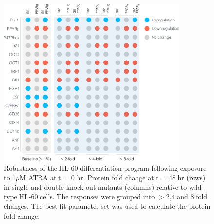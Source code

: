 \documentclass[12pt]{article}
\begin{document}
\begin{figure}[!t]\centering
\includegraphics[width=0.85\textwidth]{./figs/Fig-7-GeneKO-Simulations.pdf}
\caption{Robustness of the HL-60 differentiation program following exposure to 1$\mu$M ATRA at t = 0 hr.
Protein fold change at t = 48 hr (rows) in single and double knock-out mutants (columns) relative to wild-type HL-60 cells.
The responses were grouped into $>$2,4 and 8 fold changes.
The best fit parameter set was used to calculate the protein fold change.}\label{fig:model-response-ko-simulations}
\end{figure}
\end{document}
